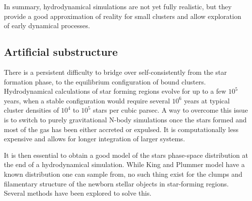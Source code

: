 In summary, hydrodynamical simulations are not yet fully realistic, but they provide a good approximation of reality for small clusters and allow exploration of early dynamical processes.


\subsection{Artificial substructure}

There is a persistent difficulty to bridge over self-consistently from the star formation phase, to the equilibrium configuration of bound clusters. Hydrodynamical calculations of star forming regions evolve for  up to a few $10^5$ years, when a stable configuration would require several $10^6$ years at typical cluster densities of $10^4$ to $10^5$ stars per cubic parsec. A way to overcome this issue is to switch to purely gravitational N-body simulations once the stars formed and most of the gas has been either accreted or expulsed. It is computationally less expensive and allows for longer integration of larger systems.

It is then essential to obtain a good model of the stars phase-space distribution at the end of a hydrodynamical simulation. While King and Plummer model have a known distribution one can sample from, no such thing exist for the clumps and filamentary structure of the newborn stellar objects in star-forming regions. Several methods have been explored to solve this.



